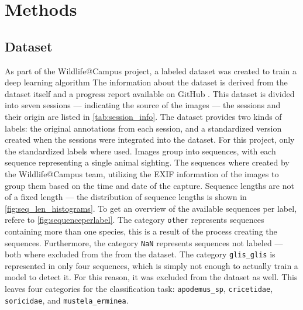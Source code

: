 

\section{Methods}
\label{methods}

    \subsection{Dataset}

    As part of the Wildlife@Campus project, a labeled dataset was created to train a deep learning algorithm
    The information about the dataset is derived from the dataset itself and a progress report available on GitHub \autocite{ratnaweeraWildlifeCampusProgressReports2021}.
    This dataset is divided into seven sessions --- indicating the source of the images --- the sessions and their origin are listed in \autoref{tab:session_info}.
    The dataset provides two kinds of labels: the original annotations from each session, and a standardized version created when the sessions were integrated into the dataset.
    For this project, only the standardized labels where used.
    Images group into sequences, with each sequence representing a single animal sighting.
    The sequences where created by the Wildlife@Campus team, utilizing the \ac{EXIF} information of the images to group them based on the time and date of the capture.
    Sequence lengths are not of a fixed length --- the distribution of sequence lengths is shown in \autoref{fig:seq_len_histograms}.
    To get an overview of the available sequences per label, refere to \autoref{fig:sequenceperlabel}.
    The category \texttt{other} represents sequences containing more than one species, this is a result of the process creating the sequences.
    Furthermore, the category \texttt{NaN} represents sequences not labeled --- both where excluded from the from the dataset.
    The category \texttt{glis\_glis} is represented in only four sequences, which is simply not enough to actually train a model to detect it.
    For this reason, it was excluded from the dataset as well.
    This leaves four categories for the classification task: \texttt{apodemus\_sp}, \texttt{cricetidae}, \texttt{soricidae}, and \texttt{mustela\_erminea}.

